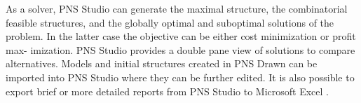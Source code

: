 As a solver, PNS Studio can generate the maximal structure, the combinatorial feasible structures, and the globally optimal
and suboptimal solutions of the problem. In the latter case the objective can be either cost minimization or profit max-
imization. PNS Studio provides a double pane view of solutions to compare alternatives.
Models and initial structures created in PNS Drawn can be imported into PNS Studio where they can be further edited. It
is also possible to export brief or more detailed reports from PNS Studio to Microsoft Excel \cite{ch3-pgraph}.
 